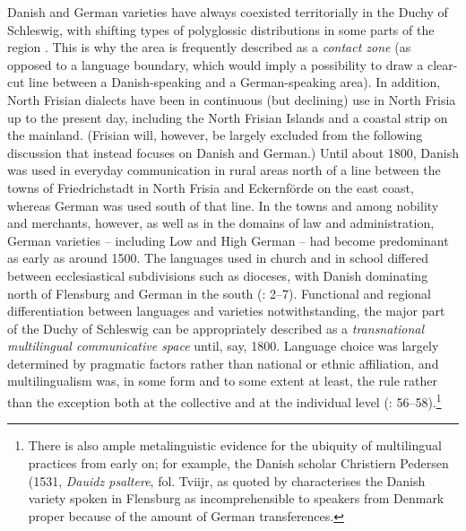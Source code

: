 \documentclass[output=paper]{langsci/langscibook}
\begin{document}
Danish and German varieties have always coexisted territorially in the Duchy of Schleswig, with shifting types of polyglossic distributions in some parts of the region \citep{Winge.2004}. This is why the area is frequently described as a \textit{contact zone} (as opposed to a language boundary, which would imply a possibility to draw a clear-cut line between a Danish-speaking and a German-speaking area). In addition, North Frisian dialects have been in continuous (but declining) use in North Frisia up to the present day, including the North Frisian Islands and a coastal strip on the mainland. (Frisian will, however, be largely excluded from the following discussion that instead focuses on Danish and German.) Until about 1800, Danish was used in everyday communication in rural areas north of a line between the towns of Friedrichstadt in North Frisia and Eckernförde on the east coast, whereas German was used south of that line. In the towns and among nobility and merchants, however, as well as in the domains of law and administration, German varieties – including Low and High German – had become predominant as early as around 1500. The languages used in church and in school differed between ecclesiastical subdivisions such as dioceses, with Danish dominating north of Flensburg and German in the south (\citealt{Fredsted.2009}: 2–7). Functional and regional differentiation between languages and varieties notwithstanding, the major part of the Duchy of Schleswig can be appropriately described as a \textit{transnational multilingual communicative space} until, say, 1800. Language choice was largely determined by pragmatic factors rather than national or ethnic affiliation, and multilingualism was, in some form and to some extent at least, the rule rather than the exception both at the collective and at the individual level (\citealt{Hoder.2019a}: 56–58).\footnote{There is also ample metalinguistic evidence for the ubiquity of multilingual practices from early on; for example, the Danish scholar Christiern Pedersen (1531, \textit{Dauidz psaltere}, fol. \mbox{Tviijr}, as quoted by \citet[162]{Skautrup.1947} characterises the Danish variety spoken in Flensburg as incomprehensible to speakers from Denmark proper because of the amount of German transferences.}
\end{document}
